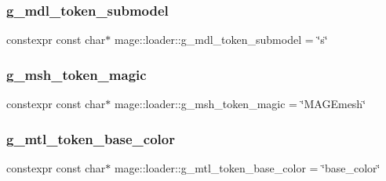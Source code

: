 \hypertarget{namespacemage_1_1loader_a435889301ec27f26e73072951e837938}{}\label{namespacemage_1_1loader_a435889301ec27f26e73072951e837938} 
\subsubsection{\texorpdfstring{g\+\_\+mdl\+\_\+token\+\_\+submodel}{g\_mdl\_token\_submodel}}
{\footnotesize\ttfamily constexpr const char$\ast$ mage\+::loader\+::g\+\_\+mdl\+\_\+token\+\_\+submodel = \char`\"{}s\char`\"{}}

\hypertarget{namespacemage_1_1loader_a47001903470655feedaec4dbe0d36bb8}{}\label{namespacemage_1_1loader_a47001903470655feedaec4dbe0d36bb8} 
\subsubsection{\texorpdfstring{g\+\_\+msh\+\_\+token\+\_\+magic}{g\_msh\_token\_magic}}
{\footnotesize\ttfamily constexpr const char$\ast$ mage\+::loader\+::g\+\_\+msh\+\_\+token\+\_\+magic = \char`\"{}M\+A\+G\+Emesh\char`\"{}}

\hypertarget{namespacemage_1_1loader_ac9ab6f0bc81e10d84dd12e8e351e91d6}{}\label{namespacemage_1_1loader_ac9ab6f0bc81e10d84dd12e8e351e91d6} 
\subsubsection{\texorpdfstring{g\+\_\+mtl\+\_\+token\+\_\+base\+\_\+color}{g\_mtl\_token\_base\_color}}
{\footnotesize\ttfamily constexpr const char$\ast$ mage\+::loader\+::g\+\_\+mtl\+\_\+token\+\_\+base\+\_\+color = \char`\"{}base\+\_\+color\char`\"{}}

\hypertarget{namespacemage_1_1loader_aa5790a41ccac032a029d1610beee41d8}{}\label{namespacemage_1_1loader_aa5790a41ccac032a029d1610beee41d8} 
